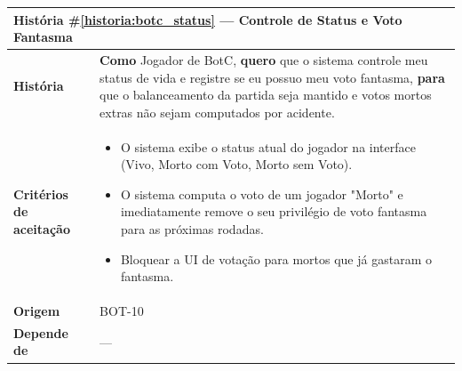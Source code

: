 \documentclass[12pt,a4paper]{article}
\newcounter{historia}
\begin{document}
\label{historia:botc_status}
\begin{table}[H]
    \centering
    \begin{tabular}{|m{4.5cm} | m{11cm}|}
    \hline
    \multicolumn{2}{|l|}{\textbf{História \#\ref{historia:botc_status} --- Controle de Status e Voto Fantasma}} \\
    \hline  \textbf{História} &
    \textbf{Como} Jogador de BotC, \newline
    \textbf{quero} que o sistema controle meu status de vida e registre se eu possuo meu voto fantasma, \newline  
    \textbf{para} que o balanceamento da partida seja mantido e votos mortos extras não sejam computados por acidente. \\
    \textbf{Critérios de aceitação} &
    \begin{itemize}
        \item{O sistema exibe o status atual do jogador na interface (Vivo, Morto com Voto, Morto sem Voto).}
        \item{O sistema computa o voto de um jogador "Morto" e imediatamente remove o seu privilégio de voto fantasma para as próximas rodadas.}
        \item{Bloquear a UI de votação para mortos que já gastaram o fantasma.}
    \end{itemize}\\
    \textbf{Origem} & BOT-10 \\
    \textbf{Depende de} & --- \\
    \hline
    \end{tabular}
\end{table}
\end{document}
